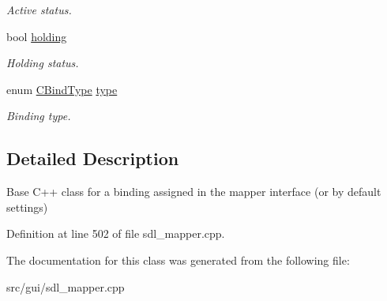 \begin{DoxyCompactItemize}
\begin{DoxyCompactList}\small\item\em Active status. \end{DoxyCompactList}\item 
\hypertarget{classCBind_a4a0d6d7650d3a24cc0bc68c985d26ade}{bool \hyperlink{classCBind_a4a0d6d7650d3a24cc0bc68c985d26ade}{holding}}\label{classCBind_a4a0d6d7650d3a24cc0bc68c985d26ade}

\begin{DoxyCompactList}\small\item\em Holding status. \end{DoxyCompactList}\item 
\hypertarget{classCBind_a9e5121ab697c2c56cb20a20bd151ac45}{enum \hyperlink{classCBind_a6bd04329a3b3b8673f7bd4469f92eb61}{C\-Bind\-Type} \hyperlink{classCBind_a9e5121ab697c2c56cb20a20bd151ac45}{type}}\label{classCBind_a9e5121ab697c2c56cb20a20bd151ac45}

\begin{DoxyCompactList}\small\item\em Binding type. \end{DoxyCompactList}\end{DoxyCompactItemize}


\subsection{Detailed Description}
Base C++ class for a binding assigned in the mapper interface (or by default settings) 

Definition at line 502 of file sdl\-\_\-mapper.\-cpp.



The documentation for this class was generated from the following file\-:\begin{DoxyCompactItemize}
\item 
src/gui/sdl\-\_\-mapper.\-cpp\end{DoxyCompactItemize}
